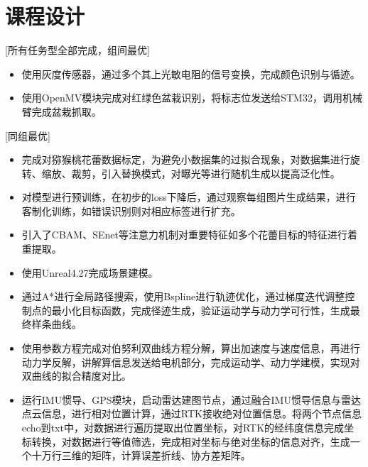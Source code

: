 \documentclass{resume}
\begin{document}
\section{课程设计}
[\textnormal{所有任务型全部完成，组间最优}]
\begin{itemize}
    \item 使用灰度传感器，通过多个其上光敏电阻的信号变换，完成颜色识别与循迹。
    \item 使用OpenMV模块完成对红绿色盆栽识别，将标志位发送给STM32，调用机械臂完成盆栽抓取。
\end{itemize}

[\textnormal{同组最优}]
\begin{itemize}
    \item 完成对猕猴桃花蕾数据标定，为避免小数据集的过拟合现象，对数据集进行旋转、缩放、裁剪，引入替换模式，对曝光等进行随机生成以提高泛化性。
    \item 对模型进行预训练，在初步的loss下降后，通过观察每组图片生成结果，进行客制化训练，如错误识别则对相应标签进行扩充。
    \item 引入了CBAM、SEnet等注意力机制对重要特征如多个花蕾目标的特征进行着重提取。
\end{itemize}
\begin{itemize}
    \item 使用Unreal4.27完成场景建模。
    \item 通过A*进行全局路径搜索，使用Bspline进行轨迹优化，通过梯度迭代调整控制点的最小化目标函数，完成径迹生成，验证运动学与动力学可行性，生成最终样条曲线。
    \item 使用参数方程完成对伯努利双曲线方程分解，算出加速度与速度信息，再进行动力学反解，讲解算信息发送给电机部分，完成运动学、动力学建模，实现对双曲线的拟合精度对比。    
\end{itemize}

\begin{itemize}
    \item 运行IMU惯导、GPS模块，启动雷达建图节点，通过融合IMU惯导信息与雷达点云信息，进行相对位置计算，通过RTK接收绝对位置信息。将两个节点信息echo到txt中，对数据进行遍历提取出位置坐标，对RTK的经纬度信息完成坐标转换，对数据进行等值筛选，完成相对坐标与绝对坐标的信息对齐，生成一个十万行三维的矩阵，计算误差折线、协方差矩阵。
\end{itemize}
\end{document}
